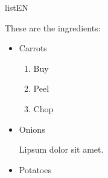 \begin{saveblock}{listEN}
                
    \begin{highlightblock}[linewidth=0.5\textwidth,gobble=8]
        These are the ingredients:
        \begin{itemize}
            \item Carrots
            \begin{enumerate}
                \item Buy
                \item Peel
                \item Chop
            \end{enumerate}
            \item Onions
            
            Lipsum dolor sit amet.
            \item Potatoes
        \end{itemize}
    \end{highlightblock}
\end{saveblock}

